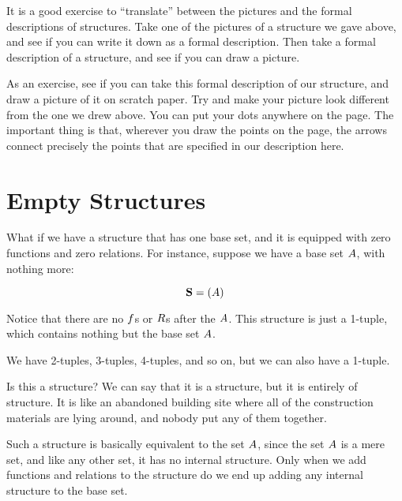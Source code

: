 \documentclass[../../../main.tex]{subfiles}
\begin{document}
\begin{aside}
  \begin{remark}
    It is a good exercise to ``translate'' between the pictures and the formal descriptions of structures. Take one of the pictures of a structure we gave above, and see if you can write it down as a formal description. Then take a formal description of a structure, and see if you can draw a picture.
  \end{remark}
\end{aside}

As an exercise, see if you can take this formal description of our structure, and draw a picture of it on scratch paper. Try and make your picture look different from the one we drew above. You can put your dots anywhere on the page. The important thing is that, wherever you draw the points on the page, the arrows connect precisely the points that are specified in our description here.


\section{Empty Structures}

What if we have a structure that has one base set, and it is equipped with zero functions and zero relations. For instance, suppose we have a base set $A$, with nothing more:

\begin{equation*}
  \mathbf{S} = (A)
\end{equation*}

Notice that there are no $f$s or $R$s after the $A$. This structure is just a 1-tuple, which contains nothing but the base set $A$. 

\begin{aside}
  \begin{remark}
    We have 2-tuples, 3-tuples, 4-tuples, and so on, but we can also have a 1-tuple.
  \end{remark}
\end{aside}

Is this a structure? We can say that it is a structure, but it is entirely  of structure. It is like an abandoned building site where all of the construction materials are lying around, and nobody put any of them together. 

Such a structure is basically equivalent to the set $A$, since the set $A$ is a mere set, and like any other set, it has no internal structure. Only when we add functions and relations to the structure do we end up adding any internal structure to the base set.
\end{document}
